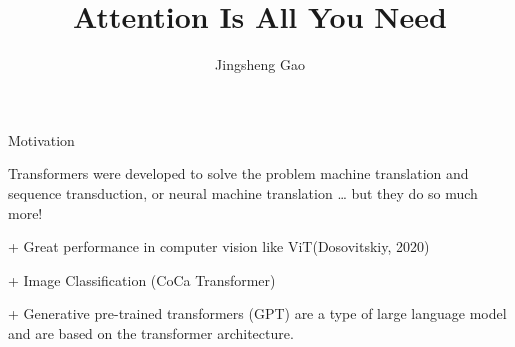 \documentclass[
  notheorems,
  aspectratio=54,
]{beamer}
\title{Attention Is All You Need}
\author{Jingsheng Gao}
\institute{Anqing Normal University}
\begin{document}
\begin{frame}
    \titlepage
\end{frame}

\newcommand{\subitem}[1]{
    {\fontsize{10}{12}\selectfont\setlength\itemindent{12pt} \item[+] #1}
}

\newcommand{\subsubitem}[1]{
    {\fontsize{10}{12}\selectfont\setlength\itemindent{40pt} \item[-] #1}
}

\begin{frame}{Motivation}
 \begin{itemize}
    \item
      Transformers were developed to solve the problem machine translation and sequence transduction, or neural machine translation … but they do so much more!
      \subitem{Great performance in computer vision like ViT(Dosovitskiy, 2020)}
      \subitem{Image Classification (CoCa Transformer)}
      \subitem{Generative pre-trained transformers (GPT) are a type of large language model and are based on the transformer architecture.}
  \end{itemize}
\end{frame}
\end{document}
